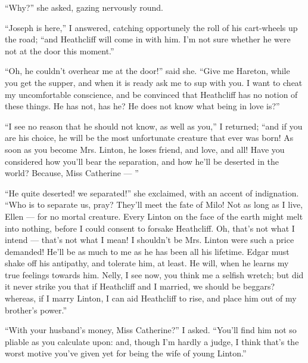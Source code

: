 \par “Why?” she asked, gazing nervously round.
\par “Joseph is here,” I answered, catching opportunely the roll of his cart-wheels up the road; “and Heathcliff will come in with him. I'm not sure whether he were not at the door this moment.”
\par “Oh, he couldn't overhear me at the door!” said she. “Give me Hareton, while you get the supper, and when it is ready ask me to sup with you. I want to cheat my uncomfortable conscience, and be convinced that Heathcliff has no notion of these things. He has not, has he? He does not know what being in love is?”
\par “I see no reason that he should not know, as well as you,” I returned; “and if you are his choice, he will be the most unfortunate creature that ever was born! As soon as you become Mrs. Linton, he loses friend, and love, and all! Have you considered how you'll bear the separation, and how he'll be deserted in the world? Because, Miss Catherine — ”
\par “He quite deserted! we separated!” she exclaimed, with an accent of indignation. “Who is to separate us, pray? They'll meet the fate of Milo! Not as long as I live, Ellen — for no mortal creature. Every Linton on the face of the earth might melt into nothing, before I could consent to forsake Heathcliff. Oh, that's not what I intend — that's not what I mean! I shouldn't be Mrs. Linton were such a price demanded! He'll be as much to me as he has been all his lifetime. Edgar must shake off his antipathy, and tolerate him, at least. He will, when he learns my true feelings towards him. Nelly, I see now, you think me a selfish wretch; but did it never strike you that if Heathcliff and I married, we should be beggars? whereas, if I marry Linton, I can aid Heathcliff to rise, and place him out of my brother's power.”
\par “With your husband's money, Miss Catherine?” I asked. “You'll find him not so pliable as you calculate upon: and, though I'm hardly a judge, I think that's the worst motive you've given yet for being the wife of young Linton.”
